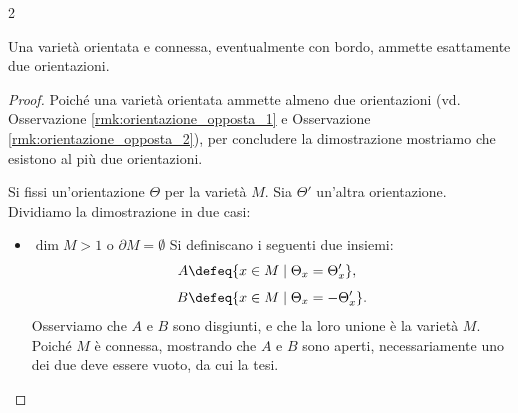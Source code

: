 \begin{multicols*}{2}
    \begin{proposition}
        Una varietà orientata e connessa, eventualmente con bordo, ammette esattamente due orientazioni.
    \end{proposition}

    \begin{proof}
        Poiché una varietà orientata ammette almeno due orientazioni (vd. Osservazione \ref{rmk:orientazione_opposta_1}
        e Osservazione \ref{rmk:orientazione_opposta_2}), per concludere la dimostrazione mostriamo che esistono al
        più due orientazioni. \smallskip

        Si fissi un'orientazione $\Theta$ per la varietà $M$. Sia $\Theta'$ un'altra orientazione.
        Dividiamo la dimostrazione in due casi:
        \begin{itemize}
            \item $\boxed{\dim M > 1 \text{ o } \partial M = \emptyset}$ Si definiscano i seguenti due insiemi:
                  \begin{equation*}
                      \begin{aligned}
                          A & \defeq \{ x \in M \mid \Theta_x = \Theta'_x \},  \\[1ex]
                          B & \defeq \{ x \in M \mid \Theta_x = -\Theta'_x \}.
                      \end{aligned}
                  \end{equation*}
                  Osserviamo che $A$ e $B$ sono disgiunti, e che la loro unione è la varietà $M$. Poiché
                  $M$ è connessa, mostrando che $A$ e $B$ sono aperti, necessariamente uno dei due deve essere
                  vuoto, da cui la tesi. \smallskip


\end{itemize}
\end{proof}
\end{multicols*}

